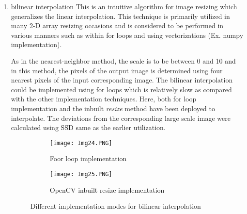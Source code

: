 \documentclass[11pt]{scrartcl}
\begin{document}
{\begin{enumerate}[label=(\alph*)]
Since the task needs to zoom the input image upto 10 (greater than 0), the zooming scale is defined to be (0,10]. Afterwards, the out image size is determined and then each pixel in the output image is "assumed" through the values of the input pixels. The obtained results were compared using the given corresponding large\-scale image by using sum of squared difference (SSD).


\begin{figure}
\centering
\begin{subfigure}{.5\textwidth}
  \centering
  \texttt{[image: Img21.PNG]}
  \caption{Zoomed im01small.png by scale 4}
  \label{fig:sub1}
\end{subfigure}%
\begin{subfigure}{0.5\textwidth}
  \centering
  \texttt{[image: Img23.PNG]}
  \caption{Zoomed im02small.png and corresponding SSD value}
  \label{fig:sub2}
\end{subfigure}
\caption{Results from nearest-neighbour interpolation}
\label{fig:test}
\end{figure}

\newpage
\item bilinear interpolation \newline
This is an intuitive algorithm for image resizing which generalizes the linear interpolation. This technique is primarily utilized in many 2-D array resizing occasions and is considered to be performed in various manners such as within for loops and using vectorizations (Ex. numpy implementation). 

As in the nearest-neighbor method, the scale is to be between 0 and 10 and in this method, the pixels of the output image is determined using four nearest pixels of the input corresponding image. The bilinear interpolation could be implemented using for loops which is relatively slow as compared with the other implementation techniques. Here, both for loop implementation and the inbuilt \textit{resize} method have been deployed to interpolate. The deviations from the corresponding large scale image were calculated using SSD same as the earlier utilization. 

\begin{figure}
\centering
\begin{subfigure}{.5\textwidth}
  \centering
  \texttt{[image: Img24.PNG]}
  \caption{Foor loop implementation}
  \label{fig:sub1}
\end{subfigure}%
\begin{subfigure}{0.5\textwidth}
  \centering
  \texttt{[image: Img25.PNG]}
  \caption{OpenCV inbuilt resize implementation}
  \label{fig:sub2}
\end{subfigure}
\caption{Different implementation modes for bilinear interpolation}
\label{fig:test}
\end{figure}


\end{enumerate}}
\end{document}
